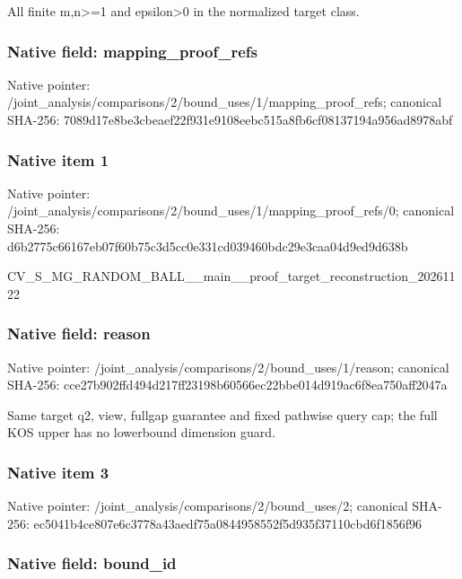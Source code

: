 \documentclass[10pt,a4paper]{article}
\begin{document}
All finite m,n>=1 and epsilon>0 in the normalized target class.


\subsubsection{Native field: mapping\_proof\_refs}


Native pointer: /joint\_analysis/comparis\allowbreak{}ons/2/bound\_uses/1/mappi\allowbreak{}ng\_proof\_refs; canonical SHA-256: 7089d17e8be3cbeaef22f931\allowbreak{}e9108eebc515a8fb6cf08137\allowbreak{}194a956ad8978abf



\subsubsection{Native item 1}


Native pointer: /joint\_analysis/comparis\allowbreak{}ons/2/bound\_uses/1/mappi\allowbreak{}ng\_proof\_refs/0; canonical SHA-256: d6b2775c66167eb07f60b75c\allowbreak{}3d5cc0e331cd039460bdc29e\allowbreak{}3caa04d9ed9d638b


CV\_S\_MG\_RANDOM\_BALL\_\_mai\allowbreak{}n\_\_proof\_target\_reconstr\allowbreak{}uction\_20261122


\subsubsection{Native field: reason}


Native pointer: /joint\_analysis/comparis\allowbreak{}ons/2/bound\_uses/1/reaso\allowbreak{}n; canonical SHA-256: cce27b902ffd494d217ff231\allowbreak{}98b60566ec22bbe014d919ac\allowbreak{}6f8ea750aff2047a


Same target q2, view, fullgap guarantee and fixed pathwise query cap; the full KOS upper has no lowerbound dimension guard.


\subsubsection{Native item 3}


Native pointer: /joint\_analysis/comparis\allowbreak{}ons/2/bound\_uses/2; canonical SHA-256: ec5041b4ce807e6c3778a43a\allowbreak{}edf75a0844958552f5d935f3\allowbreak{}7110cbd6f1856f96



\subsubsection{Native field: bound\_id}
\end{document}
